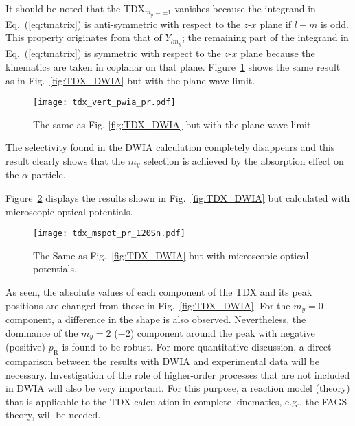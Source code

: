 \documentclass[%
 reprint,
superscriptaddress,
 amsmath,amssymb,
 aps,
]{revtex4-2}
\begin{document}
It should be noted that the TDX$_{m_y=\pm 1}$ vanishes because the integrand in 
Eq.~(\ref{eq:tmatrix}) is anti-symmetric with respect to the $z$-$x$ plane 
if $l-m$ is odd.  
This property originates from that of $Y_{lm_y}$; the remaining part 
of the integrand in Eq.~(\ref{eq:tmatrix}) is symmetric with respect to 
the $z$-$x$ plane because the kinematics are taken in coplanar on that plane. 
Figure~\ref{fig:TDX_PWIA} shows the same result as in Fig.~\ref{fig:TDX_DWIA} 
but with the plane-wave limit.
\begin{figure}[h]
  \centering
  \texttt{[image: tdx\_vert\_pwia\_pr.pdf]}
  \caption{The same as Fig. \ref{fig:TDX_DWIA} but with the plane-wave limit.}
  \label{fig:TDX_PWIA}
\end{figure}
The selectivity found in the DWIA calculation completely disappears and 
this result clearly shows that the $m_y$ selection is achieved by 
the absorption effect on the $\alpha$ particle.

Figure~\ref{fig:TDX_DWIA_micro} displays the results shown in Fig.~\ref{fig:TDX_DWIA} but calculated with microscopic optical potentials.
\begin{figure}[h]
  \centering
  \texttt{[image: tdx\_mspot\_pr\_120Sn.pdf]}
  \caption{The Same as Fig.~\ref{fig:TDX_DWIA} but with microscopic optical potentials.}
  \label{fig:TDX_DWIA_micro}
\end{figure}
As seen, the absolute values of each component of the TDX and its peak positions are changed from those in Fig.~\ref{fig:TDX_DWIA}. For the $m_y=0$ component, a difference in the shape is also observed. Nevertheless, the dominance of the $m_y=2$ ($-2$) component around the peak with negative (positive) $p_{\mathrm{R}}$ is found to be robust. For more quantitative discussion, a direct comparison between the results with DWIA and experimental data will be necessary. Investigation of the role of higher-order processes that are not included in DWIA will also be very important. For this purpose, a reaction model (theory) that is applicable to the TDX calculation in complete kinematics, e.g., the FAGS theory, will be needed. 
\end{document}
